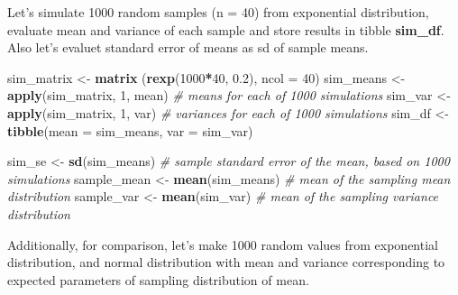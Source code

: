 \documentclass[]{article}
\newenvironment{Shaded}{\begin{snugshade}}{\end{snugshade}}
\newcommand{\KeywordTok}[1]{\textcolor[rgb]{0.13,0.29,0.53}{\textbf{#1}}}
\newcommand{\DataTypeTok}[1]{\textcolor[rgb]{0.13,0.29,0.53}{#1}}
\newcommand{\DecValTok}[1]{\textcolor[rgb]{0.00,0.00,0.81}{#1}}
\newcommand{\FloatTok}[1]{\textcolor[rgb]{0.00,0.00,0.81}{#1}}
\newcommand{\StringTok}[1]{\textcolor[rgb]{0.31,0.60,0.02}{#1}}
\newcommand{\CommentTok}[1]{\textcolor[rgb]{0.56,0.35,0.01}{\textit{#1}}}
\newcommand{\OperatorTok}[1]{\textcolor[rgb]{0.81,0.36,0.00}{\textbf{#1}}}
\newcommand{\NormalTok}[1]{#1}
\begin{document}
Let's simulate 1000 random samples (n = 40) from exponential
distribution, evaluate mean and variance of each sample and store
results in tibble \textbf{sim\_df}. Also let's evaluet standard error of
means as sd of sample means.

\begin{Shaded}
\begin{Highlighting}[]
\NormalTok{sim_matrix <-}\StringTok{ }\KeywordTok{matrix}\NormalTok{ (}\KeywordTok{rexp}\NormalTok{(}\DecValTok{1000}\OperatorTok{*}\DecValTok{40}\NormalTok{, }\FloatTok{0.2}\NormalTok{), }\DataTypeTok{ncol =} \DecValTok{40}\NormalTok{)}
\NormalTok{sim_means <-}\StringTok{ }\KeywordTok{apply}\NormalTok{(sim_matrix, }\DecValTok{1}\NormalTok{, mean)    }\CommentTok{# means for each of 1000 simulations}
\NormalTok{sim_var <-}\StringTok{ }\KeywordTok{apply}\NormalTok{(sim_matrix, }\DecValTok{1}\NormalTok{, var)       }\CommentTok{# variances for each of 1000 simulations}
\NormalTok{sim_df <-}\StringTok{ }\KeywordTok{tibble}\NormalTok{(}\DataTypeTok{mean =}\NormalTok{ sim_means, }\DataTypeTok{var =}\NormalTok{ sim_var)}

\NormalTok{sim_se <-}\StringTok{ }\KeywordTok{sd}\NormalTok{(sim_means)                    }\CommentTok{# sample standard error of the mean, based on 1000 simulations}
\NormalTok{sample_mean <-}\StringTok{ }\KeywordTok{mean}\NormalTok{(sim_means)             }\CommentTok{# mean of the sampling mean distribution}
\NormalTok{sample_var <-}\StringTok{ }\KeywordTok{mean}\NormalTok{(sim_var)                }\CommentTok{# mean of the sampling variance distribution}
\end{Highlighting}
\end{Shaded}

Additionally, for comparison, let's make 1000 random values from
exponential distribution, and normal distribution with mean and variance
corresponding to expected parameters of sampling distribution of mean.

\begin{Shaded}
\end{Shaded}
\end{document}
